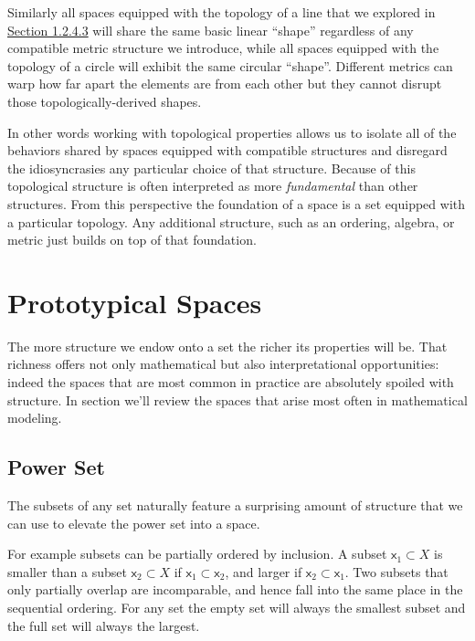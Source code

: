 \documentclass[
  letterpaper,
  DIV=11,
  numbers=noendperiod]{scrartcl}
\begin{document}
Similarly all spaces equipped with the topology of a line that we
explored in \href{@sec:general-topology}{Section 1.2.4.3} will share the
same basic linear ``shape'' regardless of any compatible metric
structure we introduce, while all spaces equipped with the topology of a
circle will exhibit the same circular ``shape''. Different metrics can
warp how far apart the elements are from each other but they cannot
disrupt those topologically-derived shapes.

In other words working with topological properties allows us to isolate
all of the behaviors shared by spaces equipped with compatible
structures and disregard the idiosyncrasies any particular choice of
that structure. Because of this topological structure is often
interpreted as more \emph{fundamental} than other structures. From this
perspective the foundation of a space is a set equipped with a
particular topology. Any additional structure, such as an ordering,
algebra, or metric just builds on top of that foundation.

\hypertarget{sec:proto-spaces}{%
\section{Prototypical Spaces}\label{sec:proto-spaces}}

The more structure we endow onto a set the richer its properties will
be. That richness offers not only mathematical but also interpretational
opportunities: indeed the spaces that are most common in practice are
absolutely spoiled with structure. In section we'll review the spaces
that arise most often in mathematical modeling.

\hypertarget{power-set}{%
\subsection{Power Set}\label{power-set}}

The subsets of any set naturally feature a surprising amount of
structure that we can use to elevate the power set into a space.

For example subsets can be partially ordered by inclusion. A subset
\(\mathsf{x}_{1} \subset X\) is smaller than a subset
\(\mathsf{x}_{2} \subset X\) if
\(\mathsf{x}_{1} \subset \mathsf{x}_{2}\), and larger if
\(\mathsf{x}_{2} \subset \mathsf{x}_{1}\). Two subsets that only
partially overlap are incomparable, and hence fall into the same place
in the sequential ordering. For any set the empty set will always the
smallest subset and the full set will always the largest.
\end{document}
